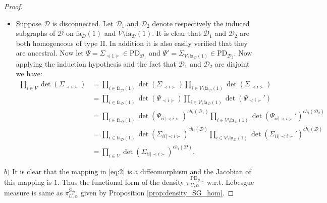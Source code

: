\documentclass[12pt]{article}
\newcommand{\D}{\mathcal{D}}
\newcommand{\G}{\mathcal{G}}
\theoremstyle{plain}
\theoremstyle{definition}
\theoremstyle{remark}
\begin{document}
\begin{proof}
\begin{itemize}
$\prod_{i=2}^{p}\det(\Sigma_{\prec i\succ})= \prod_{i=2}^{p}\Sigma_{ii| \prec i\succ}^{ch_{i}(\D_{[1]})}$. Now we claim that $\mathrm{fa}_\D(1)=V$. Assume to the contrary that $V\setminus \mathrm{fa}_\D(1)\neq \emptyset$. Since $\D$ is connected, this implies that there exist vertices $i\in \mathrm{fa}_\D(1)$  and $j\in V\setminus \mathrm{fa}_\D(1)$ such that $i,j$ are adjacent in $\D$. But this implies $j\rightarrow i\rightarrow 1$ or $j\leftarrow i\rightarrow 1$. By definition these induced subgraphs cannot occur in $\D$. Thus $\preceq 1\succeq =V$ and therefore we have $\det(\Sigma_{\prec 1\succ})=\Sigma_{11|\prec 1\succ}^{-1}\det(\Sigma)=\prod_{i=2}^{p}\Sigma_{ii|\prec i\succ}$.
Also the fact that $\mathrm{fa}_\D(1)=V$  implies that for each $i\in V\setminus\left\{1\right\}$ we have $\mathrm{ch}_{i}(\D_{[1]})=\mathrm{ch}_{i}(\D)-1$. Therefore
\begin{equation*}
\prod_{i\in V}\det(\Sigma_{\prec i\succ})=\det(\Sigma_{\prec 1\succ})\prod_{i=2}^{p}\det(\Sigma_{\prec i\succ})
=\prod_{i=2}^{p}\Sigma_{ii|\prec i\succ}\prod_{i=2}^{p}\Sigma_{ii|\prec i\succ}^{ch_{i}(\D_{[1]})}
=\prod_{i\in V}\Sigma_{ii| \prec i\succ}^{ch_{i}(\D)}.
\end{equation*}
\renewcommand{\labelitemi}{Case 2)}
\item Suppose $\D$ is disconnected.  Let $\D_{1}$  and $\D_{2}$ denote respectively the induced subgraphs of $\D$ on $\mathrm{fa}_{D}(1)$ and $V\setminus \mathrm{fa}_\D(1)$. It is clear that $\D_{1}$ and $\D_{2}$  are both homogeneous of type II. In addition it is also easily verified that they are ancestral. Now let $\Psi=\Sigma_{\preceq 1\succeq}\in \mathrm{PD}_{\D_{1}}$ and 
$\Psi'=\Sigma_{V\setminus \mathrm{fa}_\D(1)}\in \mathrm{PD}_{\D_{2}}$. Now applying the induction hypothesis and the fact that $\D_{1}$  and $\D_{2}$ are disjoint we have:
\begin{align*}
\prod_{i\in V}\det(\Sigma_{\prec i\succ})&=\prod_{i\in \mathrm{fa}_\D(1)}\det(\Sigma_{\prec i\succ})  \prod_{i\in V\setminus\mathrm{fa}_\D(1)}\det(\Sigma_{\prec i\succ})\\
&=\prod_{i\in \mathrm{fa}_\D(1)}\det(\Psi_{\prec i\succ})  \prod_{i\in V\setminus\mathrm{fa}_\D(1)}\det(\Psi_{\prec i\succ}')\\
&=\prod_{i\in \mathrm{fa}_\D(1)}\det(\Psi_{ii|\prec i\succ})^{ch_{i}(\D_{1})}  \prod_{i\in V\setminus\mathrm{fa}_\D(1)}\det(\Psi_{ii|\prec i\succ}')^{ch_{i}(\D_{2})}\\
&=\prod_{i\in \mathrm{fa}_\D(1)}\det(\Sigma_{ii|\prec i\succ})^{ch_{i}(\D)}  \prod_{i\in V\setminus\mathrm{fa}_\D(1)}\det(\Sigma_{ii|\prec i\succ}')^{ch_{i}(\D)}\\
&=\prod_{i\in V}\det(\Sigma_{ii|\prec i\succ})^{ch_{i}(\D)}.
\end{align*}
\end{itemize}
$b)$  It is clear that the mapping in  \eqref{eq:2} is a diffeomorphism  and the Jacobian of this mapping is $1$. Thus  the functional form of the density $\pi_{U,\alpha}^{\mathrm{PD}_{\G_{\mathrm{cov}}}}$ w.r.t. Lebesgue measure is same as $\pi_{U,\alpha}^{\mathrm{S}_{\D}}$ given by Proposition \ref{prop:density_SG_hom}.
 \end{proof}
\end{document}

